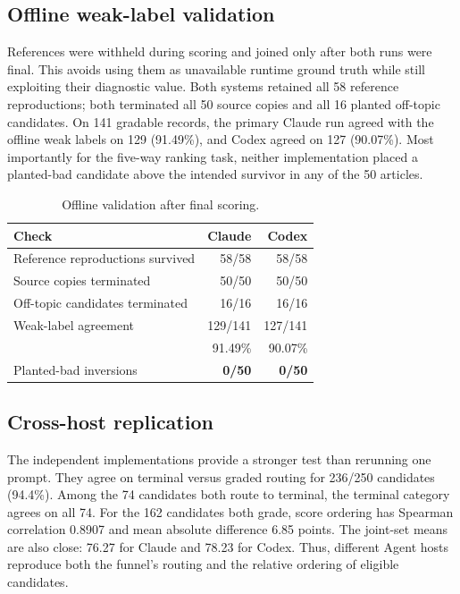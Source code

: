 \documentclass[conference]{IEEEtran}
\begin{document}
\subsection{Offline weak-label validation}
References were withheld during scoring and joined only after both runs were final. This avoids using them as unavailable runtime ground truth while still exploiting their diagnostic value. Both systems retained all 58 reference reproductions; both terminated all 50 source copies and all 16 planted off-topic candidates. On 141 gradable records, the primary Claude run agreed with the offline weak labels on 129 (91.49\%), and Codex agreed on 127 (90.07\%). Most importantly for the five-way ranking task, neither implementation placed a planted-bad candidate above the intended survivor in any of the 50 articles.

\begin{table}[t]
\caption{Offline validation after final scoring.}
\label{tab:offline}
\centering
\footnotesize
\begin{tabularx}{\columnwidth}{@{}Yrr@{}}
\toprule
\textbf{Check} & \textbf{Claude} & \textbf{Codex} \\
\midrule
Reference reproductions survived & 58/58 & 58/58 \\
Source copies terminated & 50/50 & 50/50 \\
Off-topic candidates terminated & 16/16 & 16/16 \\
Weak-label agreement & 129/141 & 127/141 \\
& 91.49\% & 90.07\% \\
Planted-bad inversions & \textbf{0/50} & \textbf{0/50} \\
\bottomrule
\end{tabularx}
\end{table}

\subsection{Cross-host replication}
The independent implementations provide a stronger test than rerunning one prompt. They agree on terminal versus graded routing for 236/250 candidates (94.4\%). Among the 74 candidates both route to terminal, the terminal category agrees on all 74. For the 162 candidates both grade, score ordering has Spearman correlation 0.8907 and mean absolute difference 6.85 points. The joint-set means are also close: 76.27 for Claude and 78.23 for Codex. Thus, different Agent hosts reproduce both the funnel's routing and the relative ordering of eligible candidates.
\end{document}

